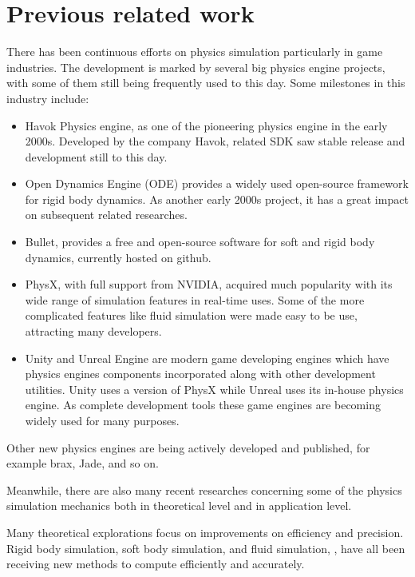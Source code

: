 \documentclass[12pt,a4paper,twoside,openright]{report}
\begin{document}
\section{Previous related work}

There has been continuous efforts on physics simulation particularly in game industries. The development is marked by several big physics engine projects, with some of them still being frequently used to this day. Some milestones in this industry include:

\begin{itemize}
\item Havok Physics engine\cite{havoks}, as one of the pioneering physics engine in the early 2000s. Developed by the company Havok, related SDK saw stable release and development still to this day.
\item Open Dynamics Engine (ODE)\cite{smith2005open} provides a widely used open-source framework for rigid body dynamics. As another early 2000s project, it has a great impact on subsequent related researches.
\item Bullet\cite{bullet}, provides a free and open-source software for soft and rigid body dynamics, currently hosted on github\cite{bulletgithub}.
\item PhysX\cite{physx}, with full support from NVIDIA, acquired much popularity with its wide range of simulation features in real-time uses. Some of the more complicated features like fluid simulation were made easy to be use, attracting many developers.
\item Unity and Unreal Engine\cite{sanders2016introduction} are modern game developing engines which have physics engines components incorporated along with other development utilities. Unity uses a version of PhysX while Unreal uses its in-house physics engine. As  complete development tools these game engines are becoming widely used for many purposes.
\end{itemize}

Other new physics engines are being actively developed and published, for example brax\cite{freeman2021brax}, Jade\cite{yang2023jade}, and so on.

Meanwhile, there are also many recent researches concerning some of the physics simulation mechanics both in theoretical level and in application level.

Many theoretical explorations focus on improvements on efficiency and precision. Rigid body simulation\cite{singh2022efficient}, soft body simulation\cite{li2022contact}, and fluid simulation\cite{obiols2020cfdnet}, \cite{klower2022fluid}, \cite{vinuesa2022enhancing} have all been receiving new methods to compute efficiently and accurately.
\end{document}
